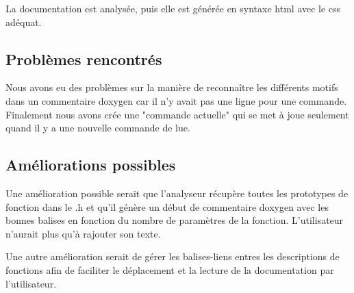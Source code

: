 \documentclass[10pt,a4paper]{report}
\begin{document}
La documentation est analysée, puis elle est générée en syntaxe html avec le css adéquat.

\subsection{Problèmes rencontrés}
Nous avons eu des problèmes sur la manière de reconnaître les différents motifs dans un commentaire doxygen car il n'y avait pas une ligne pour une commande. Finalement nous avons crée une "commande actuelle" qui se met à joue seulement quand il y a une nouvelle commande de lue.


\subsection{Améliorations possibles}
Une amélioration possible serait que l'analyseur récupère toutes les prototypes de fonction dans le .h et qu'il génère un début de commentaire doxygen avec les bonnes balises en fonction du nombre de paramètres de la fonction. L'utilisateur n'aurait plus qu'à rajouter son texte.

Une autre amélioration serait de gérer les balises-liens entres les descriptions de fonctions afin de faciliter le déplacement et la lecture de la documentation par l'utilisateur.
\end{document}
